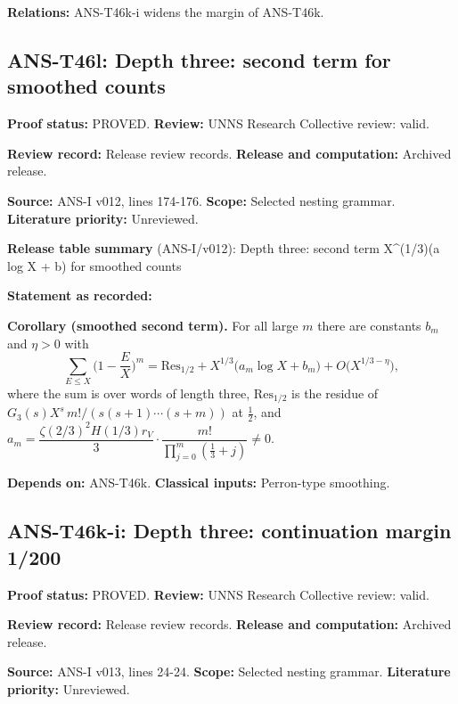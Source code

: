 \documentclass[
  11pt,
]{article}
\begin{document}
\textbf{Relations:} ANS-T46k-i widens the margin of ANS-T46k.

\hypertarget{ans-t46l-depth-three-second-term-for-smoothed-counts}{%
\subsection{ANS-T46l: Depth three: second term for smoothed
counts}\label{ans-t46l-depth-three-second-term-for-smoothed-counts}}

\textbf{Proof status:} PROVED. \textbf{Review:} UNNS Research Collective
review: valid.

\textbf{Review record:} Release review records. \textbf{Release and
computation:} Archived release.

\textbf{Source:} ANS-I v012, lines 174-176. \textbf{Scope:} Selected
nesting grammar. \textbf{Literature priority:} Unreviewed.

\textbf{Release table summary} (ANS-I/v012): Depth three: second term
X\^{}(1/3)(a log X + b) for smoothed counts

\textbf{Statement as recorded:}

\textbf{Corollary (smoothed second term).} For all large \(m\) there are
constants \(b_m\) and \(\eta>0\) with
\[\sum_{E\le X}\Big(1-\frac EX\Big)^m=\mathrm{Res}_{1/2}+X^{1/3}\big(a_m\log X+b_m\big)+O\big(X^{1/3-\eta}\big),\]
where the sum is over words of length three, \(\mathrm{Res}_{1/2}\) is
the residue of \(G_3(s)X^s\,m!/(s(s+1)\cdots(s+m))\) at \(\frac12\), and
\(a_m=\dfrac{\zeta(2/3)^2H(1/3)r_V}3\cdot\dfrac{m!}{\prod_{j=0}^m(\frac13+j)}\ne0\).

\textbf{Depends on:} ANS-T46k. \textbf{Classical inputs:} Perron-type
smoothing.

\hypertarget{ans-t46k-i-depth-three-continuation-margin-1200}{%
\subsection{ANS-T46k-i: Depth three: continuation margin
1/200}\label{ans-t46k-i-depth-three-continuation-margin-1200}}

\textbf{Proof status:} PROVED. \textbf{Review:} UNNS Research Collective
review: valid.

\textbf{Review record:} Release review records. \textbf{Release and
computation:} Archived release.

\textbf{Source:} ANS-I v013, lines 24-24. \textbf{Scope:} Selected
nesting grammar. \textbf{Literature priority:} Unreviewed.
\end{document}
